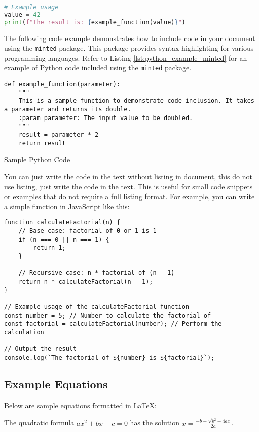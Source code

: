 \documentclass[12pt,a4paper]{report}
\begin{document}
\begin{spacing}{1.5}
\begin{lstlisting}[language=Python, caption=Example Python Code, breaklines=true, label=lst:python_example]
# Example usage
value = 42
print(f"The result is: {example_function(value)}")
    \end{lstlisting}
    The following code example demonstrates how to include code in your document using the \texttt{minted} package. This package provides syntax highlighting for various programming languages. Refer to Listing \ref{lst:python_example_minted} for an example of Python code included using the \texttt{minted} package.
    \begin{listing}[H]
        \begin{verbatim}
def example_function(parameter):
    """
    This is a sample function to demonstrate code inclusion. It takes a parameter and returns its double.
    :param parameter: The input value to be doubled.
    """
    result = parameter * 2
    return result
        \end{verbatim}
        \caption{Sample Python Code}
        \label{lst:python_example_minted}
    \end{listing}


    You can just write the code in the text without listing in document, this do not use listing, just write the code in the text. This is useful for small code snippets or examples that do not require a full listing format. For example, you can write a simple function in JavaScript like this:
    \begin{verbatim}
function calculateFactorial(n) {
    // Base case: factorial of 0 or 1 is 1
    if (n === 0 || n === 1) {
        return 1;
    }

    // Recursive case: n * factorial of (n - 1)
    return n * calculateFactorial(n - 1);
}

// Example usage of the calculateFactorial function
const number = 5; // Number to calculate the factorial of
const factorial = calculateFactorial(number); // Perform the calculation

// Output the result
console.log(`The factorial of ${number} is ${factorial}`);
    \end{verbatim}

    \subsection{Example Equations}
    Below are sample equations formatted in LaTeX:

    The quadratic formula $ax^2 + bx + c = 0$ has the solution $x = \frac{-b \pm \sqrt{b^2 - 4ac}}{2a}$.


\end{spacing}
\end{document}
